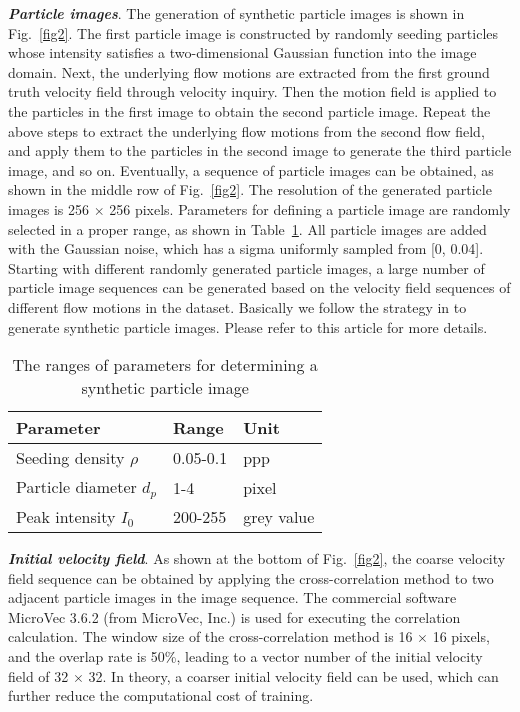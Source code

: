 \documentclass[%
 aip,
 amsmath,amssymb,
 reprint,%
]{revtex4-1}
\begin{document}
\textbf{\textit{Particle images}}. The generation of synthetic particle images is shown in Fig.~\ref{fig2}.
The first particle image is constructed by randomly seeding particles whose intensity satisfies a two-dimensional Gaussian function into the image domain.
Next, the underlying flow motions are extracted from the first ground truth velocity field through velocity inquiry. 
Then the motion field is applied to the particles in the first image to obtain the second particle image.
Repeat the above steps to extract the underlying flow motions from the second flow field, and apply them to the particles in the second image to generate the third particle image, and so on.
Eventually, a sequence of particle images can be obtained, as shown in the middle row of Fig.~\ref{fig2}.
The resolution of the generated particle images is 256 $\times$ 256 pixels.
Parameters for defining a particle image are randomly selected in a proper range, as shown in Table~\ref{tab2}.
All particle images are added with the Gaussian noise, which has a sigma uniformly sampled from [0, 0.04].
Starting with different randomly generated particle images, a large number of particle image sequences can be generated based on the velocity field sequences of different flow motions in the dataset. 
Basically we follow the strategy in \citet{cai2019} to generate synthetic particle images. Please refer to this article for more details.

\begin{table}[h]
\begin{center}
\caption{The ranges of parameters for determining a synthetic particle image}\label{tab2}%
\begin{tabular}{ p{3cm} p{2cm} p{2cm}  }
\hline
Parameter & Range  & Unit \\
\hline
Seeding density $\rho$    & 0.05-0.1 & ppp  \\
Particle diameter $d_{p}$    & 1-4 & pixel  \\
Peak intensity $I_{0}$    & 200-255 & grey value  \\
\hline
\end{tabular}
\end{center}
\end{table}

\textbf{\textit{Initial velocity field}}. 
As shown at the bottom of Fig.~\ref{fig2}, the coarse velocity field sequence can be obtained by applying the cross-correlation method to two adjacent particle images in the image sequence.
The commercial software MicroVec 3.6.2 (from MicroVec, Inc.) is used for executing the correlation calculation. 
The window size of the cross-correlation method is 16 $\times$ 16 pixels, and the overlap rate is 50\%, leading to a vector number of the initial velocity field of 32 $\times$ 32. In theory, a coarser initial velocity field can be used, which can further reduce the computational cost of training.
\end{document}
